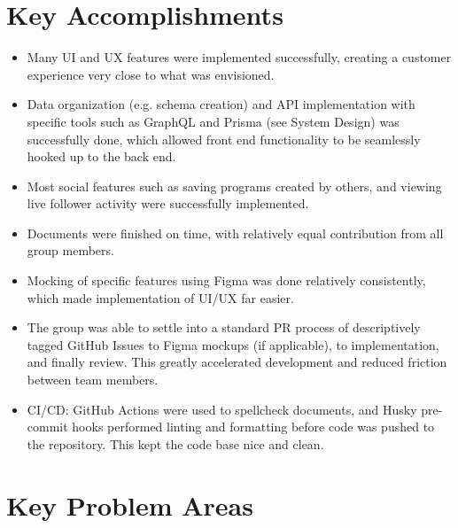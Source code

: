 \documentclass{article}
\begin{document}
\section{Key Accomplishments}


\begin{itemize}
	\item Many UI and UX features were implemented successfully, creating a customer experience very close to what was envisioned. 
	
	\item Data organization (e.g. schema creation) and API implementation with specific tools such as GraphQL and Prisma (see System Design) was successfully done, which allowed front end functionality to be seamlessly hooked up to the back end.
	
	\item Most social features such as saving programs created by others, and viewing live follower activity were successfully implemented.
	
	\item Documents were finished on time, with relatively equal contribution from all group members. 
	
	\item Mocking of specific features using Figma was done relatively consistently, which made implementation of UI/UX far easier.
	
	\item The group was able to settle into a standard PR process of descriptively tagged GitHub Issues to Figma mockups (if applicable), to implementation, and finally review. This greatly accelerated development and reduced friction between team members.
	
	\item CI/CD: GitHub Actions were used to spellcheck documents, and Husky pre-commit hooks performed linting and formatting before code was pushed to the repository. This kept the code base nice and clean.
	
\end{itemize}


\section{Key Problem Areas}
\end{document}
